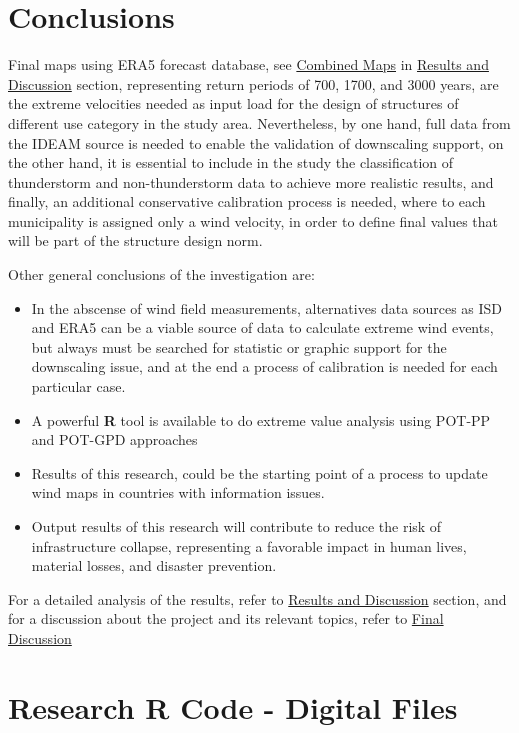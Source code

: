 \documentclass[12pt,oneside]{reedthesis}
\begin{document}
\hypertarget{conclusions}{%
\chapter{Conclusions}\label{conclusions}}

Final maps using ERA5 forecast database, see \protect\hyperlink{cm}{Combined Maps} in \protect\hyperlink{rmd-results}{Results and Discussion} section, representing return periods of 700, 1700, and 3000 years, are the extreme velocities needed as input load for the design of structures of different use category in the study area. Nevertheless, by one hand, full data from the IDEAM source is needed to enable the validation of downscaling support, on the other hand, it is essential to include in the study the classification of thunderstorm and non-thunderstorm data to achieve more realistic results, and finally, an additional conservative calibration process is needed, where to each municipality is assigned only a wind velocity, in order to define final values that will be part of the structure design norm.

Other general conclusions of the investigation are:
\begin{itemize}
\item
  In the abscense of wind field measurements, alternatives data sources as ISD and ERA5 can be a viable source of data to calculate extreme wind events, but always must be searched for statistic or graphic support for the downscaling issue, and at the end a process of calibration is needed for each particular case.
\item
  A powerful \textbf{R} tool is available to do extreme value analysis using POT-PP and POT-GPD approaches
\item
  Results of this research, could be the starting point of a process to update wind maps in countries with information issues.
\item
  Output results of this research will contribute to reduce the risk of infrastructure collapse, representing a favorable impact in human lives, material losses, and disaster prevention.
\end{itemize}
For a detailed analysis of the results, refer to \protect\hyperlink{rmd-results}{Results and Discussion} section, and for a discussion about the project and its relevant topics, refer to \protect\hyperlink{fd}{Final Discussion}

\appendix

\hypertarget{rcode}{%
\chapter{Research R Code - Digital Files}\label{rcode}}
\end{document}
